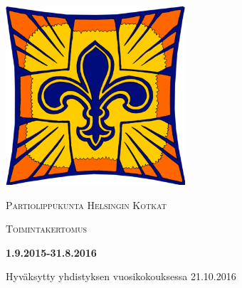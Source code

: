 \documentclass[
	pdftex,
	fontsize=11pt,
	a4paper
]{scrbook}
\begin{document}
\begin{titlepage}
	\centering
	\includegraphics[width=0.5\textwidth]{../kuvat/heko.png}\par\vspace{1cm}
	{\scshape\LARGE Partiolippukunta Helsingin Kotkat \par}
	\vspace{1cm}
	{\scshape\Large Toimintakertomus\par}
	\vspace{1.5cm}
	{\huge\bfseries 1.9.2015-31.8.2016\par}
	\vspace{2cm}
	\vfill
	\vfill
	{\large Hyväksytty yhdistyksen vuosikokouksessa 21.10.2016}
\end{titlepage}
\end{document}
